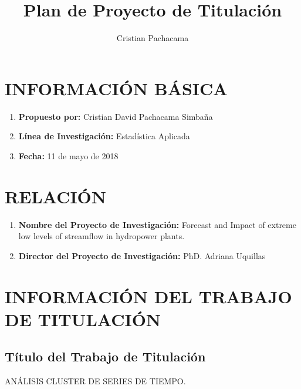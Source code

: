 \documentclass[10pt,a4paper]{article}
\author{Cristian Pachacama}
\title{Plan de Proyecto de Titulación}
\begin{document}
\maketitle
\section{INFORMACIÓN BÁSICA}


\begin{enumerate}

\item \textbf{Propuesto por:} Cristian David Pachacama Simbaña
\item \textbf{Línea de Investigación:} Estadística Aplicada
\item \textbf{Fecha:} 11 de mayo de 2018

\end{enumerate}

\section{RELACIÓN}

\begin{enumerate}

\item \textbf{Nombre del Proyecto de Investigación:} Forecast and Impact of extreme low levels of streamflow in hydropower plants.
\item \textbf{Director del Proyecto de Investigación:} PhD. Adriana Uquillas

\end{enumerate}


\section{INFORMACIÓN DEL TRABAJO DE TITULACIÓN}

\subsection{Título del Trabajo de Titulación}

ANÁLISIS CLUSTER DE SERIES DE TIEMPO.
\end{document}
